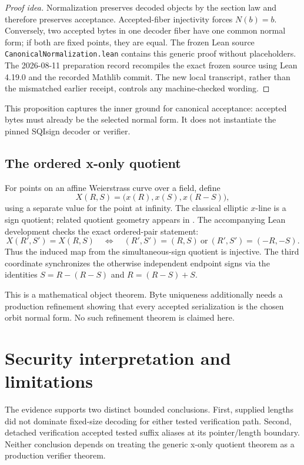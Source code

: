 \documentclass[11pt]{article}
\newcommand{\code}[1]{\texttt{#1}}
\begin{document}
\begin{proof}[Proof idea]
Normalization preserves decoded objects by the section law and therefore
preserves acceptance.  Accepted-fiber injectivity forces $N(b)=b$.
Conversely, two accepted bytes in one decoder fiber have one common normal
form; if both are fixed points, they are equal.  The frozen Lean source
\code{CanonicalNormalization.lean} contains this generic proof without
placeholders.  The 2026-08-11 preparation record recompiles the exact
frozen source using Lean 4.19.0 and the recorded Mathlib commit.  The new local
transcript, rather than the mismatched earlier receipt, controls any
machine-checked wording.
\end{proof}

This proposition captures the inner ground for canonical acceptance: accepted
bytes must already be the selected normal form.  It does not instantiate the
pinned SQIsign decoder or verifier.

\subsection{The ordered x-only quotient}

For points on an affine Weierstrass curve over a field, define
\[
  X(R,S)=\bigl(x(R),x(S),x(R-S)\bigr),
\]
using a separate value for the point at infinity.  The classical elliptic
$x$-line is a sign quotient; related quotient geometry appears in
\cite{costello-smith-2017,kohel-2016}.  The accompanying Lean development
checks the exact ordered-pair statement:
\[
  X(R',S')=X(R,S)
  \quad\Longleftrightarrow\quad
  (R',S')=(R,S)\ \text{or}\ (R',S')=(-R,-S).
\]
Thus the induced map from the simultaneous-sign quotient is injective.  The
third coordinate synchronizes the otherwise independent endpoint signs via
the identities $S=R-(R-S)$ and $R=(R-S)+S$.

This is a mathematical object theorem.  Byte uniqueness additionally needs a
production refinement showing that every accepted serialization is the chosen
orbit normal form.  No such refinement theorem is claimed here.

\section{Security interpretation and limitations}

The evidence supports two distinct bounded conclusions.  First, supplied
lengths did not dominate fixed-size decoding for either tested verification
path.  Second, detached verification accepted tested suffix aliases at its
pointer/length boundary.  Neither conclusion depends on treating the generic
x-only quotient theorem as a production verifier theorem.
\end{document}
